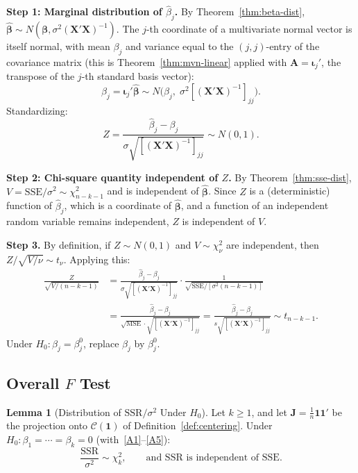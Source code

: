 \documentclass[12pt,a4paper]{article}
\makeatletter
\theoremstyle{definition}
\newtheorem{lemma}[theorem]{Lemma}
\renewenvironment{proof}[1][\proofname]{\par
  \pushQED{\qed}%
  \normalfont \topsep6\p@\@plus6\p@\relax
  \trivlist
  \item[\hskip\labelsep\bfseries #1\@addpunct{.}]\ignorespaces
}{%
  \popQED\endtrivlist\@endpefalse
}
\newcommand{\SSR}{\mathrm{SSR}}
\newcommand{\SSE}{\mathrm{SSE}}
\newcommand{\MSE}{\mathrm{MSE}}
\newcommand{\bX}{\mathbf{X}}
\def\bb{\boldsymbol{\beta}}
\newcommand{\bone}{\mathbf{1}}
\newcommand{\bA}{\mathbf{A}}
\newcommand{\calC}{\mathcal{C}}
\newcommand{\bJ}{\mathbf{J}}
\makeatother
\begin{document}
\begin{proof}
\textbf{Step 1: Marginal distribution of $\hat\beta_j$.} By Theorem~\ref{thm:beta-dist}, $\hat{\bb} \sim N(\bb, \sigma^2(\bX'\bX)^{-1})$. The $j$-th coordinate of a multivariate normal vector is itself normal, with mean $\beta_j$ and variance equal to the $(j,j)$-entry of the covariance matrix (this is Theorem~\ref{thm:mvn-linear} applied with $\bA = \boldsymbol\iota_j'$, the transpose of the $j$-th standard basis vector):
\[
\hat{\beta}_j = \boldsymbol\iota_j'\hat{\bb} \sim N\!\bigl(\beta_j,\; \sigma^2[(\bX'\bX)^{-1}]_{jj}\bigr).
\]
Standardizing:
\[
Z = \frac{\hat{\beta}_j - \beta_j}{\sigma\sqrt{[(\bX'\bX)^{-1}]_{jj}}} \sim N(0, 1).
\]

\textbf{Step 2: Chi-square quantity independent of $Z$.} By Theorem~\ref{thm:sse-dist}, $V = \SSE/\sigma^2 \sim \chi^2_{n-k-1}$ and is independent of $\hat{\bb}$. Since $Z$ is a (deterministic) function of $\hat{\beta}_j$, which is a coordinate of $\hat{\bb}$, and a function of an independent random variable remains independent, $Z$ is independent of $V$.

\textbf{Step 3.} By definition, if $Z \sim N(0,1)$ and $V \sim \chi^2_\nu$ are independent, then $Z/\sqrt{V/\nu} \sim t_\nu$. Applying this:
\begin{align*}
\frac{Z}{\sqrt{V/(n-k-1)}} &= \frac{\hat{\beta}_j - \beta_j}{\sigma\sqrt{[(\bX'\bX)^{-1}]_{jj}}} \cdot \frac{1}{\sqrt{\SSE/[\sigma^2(n-k-1)]}}\\
&= \frac{\hat{\beta}_j - \beta_j}{\sqrt{\MSE} \cdot \sqrt{[(\bX'\bX)^{-1}]_{jj}}} = \frac{\hat{\beta}_j - \beta_j}{s\sqrt{[(\bX'\bX)^{-1}]_{jj}}} \sim t_{n-k-1}.
\end{align*}
Under $H_0\colon \beta_j = \beta_j^0$, replace $\beta_j$ by $\beta_j^0$.
\end{proof}

\subsection{Overall \texorpdfstring{$F$}{F} Test}

\begin{lemma}[Distribution of $\SSR/\sigma^2$ Under $H_0$]\label{lem:SSR-chisq}
Let $k \geqslant 1$, and let $\bJ = \frac{1}{n}\bone\bone'$ be the projection onto $\calC(\bone)$ of Definition~\ref{def:centering}. Under $H_0\colon \beta_1 = \cdots = \beta_k = 0$ (with~\ref{A1}--\ref{A5}):
\[
\frac{\SSR}{\sigma^2} \sim \chi^2_k, \qquad \text{and } \SSR \text{ is independent of } \SSE.
\]
\end{lemma}
\end{document}
